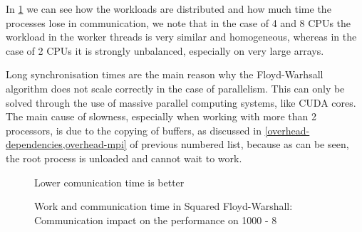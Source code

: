 In \cref{work-and-communication-time} we can see how the workloads are distributed and how much time the processes lose in communication, we note that in the case of 4 and 8 CPUs the workload in the worker threads is very similar and homogeneous, whereas in the case of 2 CPUs it is strongly unbalanced, especially on very large arrays.

Long synchronisation times are the main reason why the Floyd-Warhsall algorithm does not scale correctly in the case of parallelism. This can only be solved through the use of massive parallel computing systems, like CUDA cores.
The main cause of slowness, especially when working with more than 2 processors, is due to the copying of buffers, as discussed in \cref{overhead-dependencies,overhead-mpi} of previous numbered list, because as can be seen, the root process is unloaded and cannot wait to work.

\begin{figure}[htbp]
    \datatable
        
        \caption*{Lower comunication time is better}

    \caption{Work and communication time in Squared Floyd-Warshall: Communication impact on the performance on 1000 - 8}
    \label{work-and-communication-time}
\end{figure}

